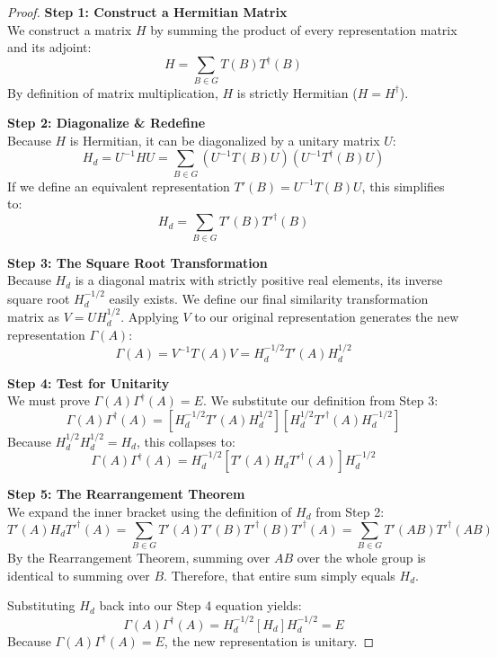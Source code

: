 \documentclass[11pt, a4paper]{report}
\begin{document}
\begin{proof}
\textbf{Step 1: Construct a Hermitian Matrix} \\
We construct a matrix $H$ by summing the product of every representation matrix and its adjoint:
\[ H = \sum_{B \in G} T(B) T^\dagger(B) \]
By definition of matrix multiplication, $H$ is strictly Hermitian ($H = H^\dagger$).

\textbf{Step 2: Diagonalize \& Redefine} \\
Because $H$ is Hermitian, it can be diagonalized by a unitary matrix $U$:
\[ H_d = U^{-1} H U = \sum_{B \in G} \left( U^{-1} T(B) U \right) \left( U^{-1} T^\dagger(B) U \right) \]
If we define an equivalent representation $T'(B) = U^{-1} T(B) U$, this simplifies to:
\[ H_d = \sum_{B \in G} T'(B) T'^\dagger(B) \]

\textbf{Step 3: The Square Root Transformation} \\
Because $H_d$ is a diagonal matrix with strictly positive real elements, its inverse square root $H_d^{-1/2}$ easily exists.
We define our final similarity transformation matrix as $V = U H_d^{1/2}$.
Applying $V$ to our original representation generates the new representation $\Gamma(A)$:
\[ \Gamma(A) = V^{-1} T(A) V = H_d^{-1/2} T'(A) H_d^{1/2} \]

\textbf{Step 4: Test for Unitarity} \\
We must prove $\Gamma(A) \Gamma^\dagger(A) = E$. We substitute our definition from Step 3:
\[ \Gamma(A) \Gamma^\dagger(A) = \left[ H_d^{-1/2} T'(A) H_d^{1/2} \right] \left[ H_d^{1/2} T'^\dagger(A) H_d^{-1/2} \right] \]
Because $H_d^{1/2} H_d^{1/2} = H_d$, this collapses to:
\[ \Gamma(A) \Gamma^\dagger(A) = H_d^{-1/2} \left[ T'(A) H_d T'^\dagger(A) \right] H_d^{-1/2} \]

\textbf{Step 5: The Rearrangement Theorem} \\
We expand the inner bracket using the definition of $H_d$ from Step 2:
\[ T'(A) H_d T'^\dagger(A) = \sum_{B \in G} T'(A)T'(B)T'^\dagger(B)T'^\dagger(A) = \sum_{B \in G} T'(AB) T'^\dagger(AB) \]
By the Rearrangement Theorem, summing over $AB$ over the whole group is identical to summing over $B$. Therefore, that entire sum simply equals $H_d$.

Substituting $H_d$ back into our Step 4 equation yields:
\[ \Gamma(A) \Gamma^\dagger(A) = H_d^{-1/2} [H_d] H_d^{-1/2} = E \]
Because $\Gamma(A) \Gamma^\dagger(A) = E$, the new representation is unitary.
\end{proof}

\newpage
\end{document}
